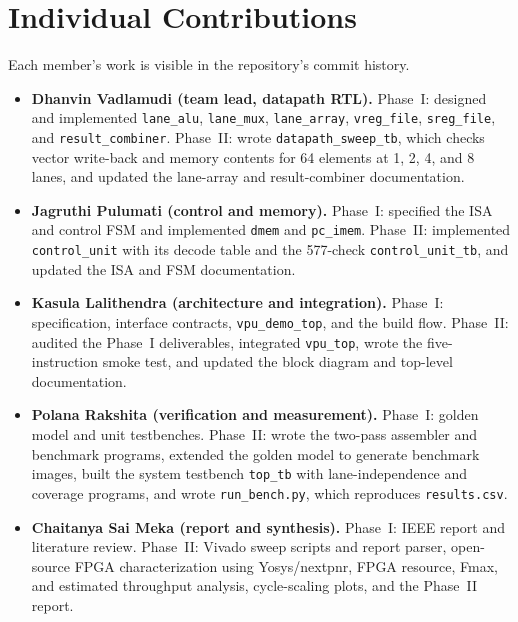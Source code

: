 \documentclass[conference]{IEEEtran}
\begin{document}
\section{Individual Contributions}
Each member's work is visible in the repository's commit history.

\begin{itemize}
  \item \textbf{Dhanvin Vadlamudi (team lead, datapath RTL).} Phase~I:
        designed and implemented \texttt{lane\_alu}, \texttt{lane\_mux},
        \texttt{lane\_array}, \texttt{vreg\_file}, \texttt{sreg\_file}, and
        \texttt{result\_combiner}. Phase~II: wrote
        \texttt{datapath\_sweep\_tb}, which checks vector write-back and
        memory contents for 64 elements at 1, 2, 4, and 8 lanes, and updated
        the lane-array and result-combiner documentation.
  \item \textbf{Jagruthi Pulumati (control and memory).} Phase~I: specified
        the ISA and control FSM and implemented \texttt{dmem} and
        \texttt{pc\_imem}. Phase~II: implemented \texttt{control\_unit}
        with its decode table and the 577-check \texttt{control\_unit\_tb},
        and updated the ISA and FSM documentation.
  \item \textbf{Kasula Lalithendra (architecture and integration).}
        Phase~I: specification, interface contracts, \texttt{vpu\_demo\_top},
        and the build flow. Phase~II: audited the Phase~I deliverables,
        integrated \texttt{vpu\_top}, wrote the five-instruction smoke test,
        and updated the block diagram and top-level documentation.
  \item \textbf{Polana Rakshita (verification and measurement).} Phase~I:
        golden model and unit testbenches. Phase~II: wrote the two-pass
        assembler and benchmark programs, extended the golden model to
        generate benchmark images, built the system testbench
        \texttt{top\_tb} with lane-independence and coverage programs, and
        wrote \texttt{run\_bench.py}, which reproduces
        \texttt{results.csv}.
  \item \textbf{Chaitanya Sai Meka (report and synthesis).} Phase~I: IEEE
        report and literature review. Phase~II: Vivado sweep scripts and
        report parser, open-source FPGA characterization using Yosys/nextpnr,
        FPGA resource, Fmax, and estimated throughput analysis, cycle-scaling
        plots, and the Phase~II report.
\end{itemize}
\end{document}
